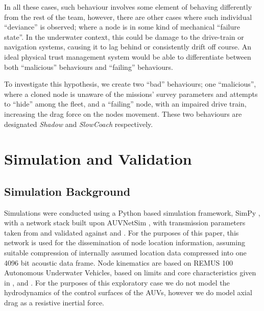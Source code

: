 \documentclass[conference]{IEEEtran}
\begin{document}
In all these cases, such behaviour involves some element of behaving differently from the rest of the team, however, there are other cases where such individual ``deviance'' is observed; where a node is in some kind of mechanical ``failure state''.
In the underwater context, this could be damage to the drive-train or navigation systems, causing it to lag behind or consistently drift off course. 
An ideal physical trust management system would be able to differentiate between both ``malicious'' behaviours and ``failing'' behaviours.

To investigate this hypothesis, we create two ``bad'' behaviours; one ``malicious'', where a cloned node is unaware of the missions' survey parameters and attempts to ``hide'' among the fleet, and a ``failing'' node, with an impaired drive train, increasing the drag force on the nodes movement.
These two behaviours are designated \emph{Shadow} and \emph{SlowCoach} respectively.

\section{Simulation and Validation}\label{sec:sim_and_valid}

\subsection{Simulation Background}

Simulations were conducted using a Python based simulation framework, SimPy \cite{Mueller2003SimPy}, with a network stack built upon AUVNetSim \cite{Miquel2008}, with transmission parameters taken from and validated against \cite{Stojanovic2007} and \cite{Stefanov2011}.
For the purposes of this paper, this network is used for the dissemination of node location information, assuming suitable compression of internally assumed location data compressed into one 4096 bit acoustic data frame.
Node kinematics are based on REMUS 100 Autonomous Underwater Vehicles, based on limits and core characteristics given in \cite{Mcewen2001}, \cite{Milgram2001} and \cite{Samad2011}.
For the purposes of this exploratory case we do not model the hydrodynamics of the control surfaces of the AUVs, however we do model axial drag as a resistive inertial force.
\end{document}
